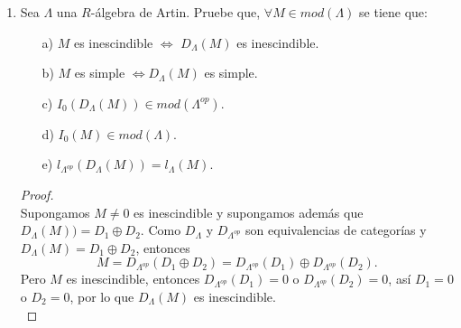 \documentclass{article}
\begin{document}
\begin{enumerate}[label=\textbf{Ej \arabic*.}]
\begin{proof}
			En resumen, todo ideal $I$ de $R$ genera un ideal $Mat_{n \times n}\lrprth{R}$ y viceversa, todo ideal $J$ de $Mat_{n \times n}\lrprth{R}$ induce un ideal de $R$. Por tanto, hay una correspondencia biunívoca
			\begin{align*}
				\lrbrack{Ideales\ de\ R} &\longrightarrow \lrbrack{Ideales\ de\ Mat_{n \times n}\lrprth{R}}\\
				I &\mapsto Mat_{n \times n}\lrprth{I}
			\end{align*}
		
			Finalmente, sea $D$ un anillo con división. Entonces los únicos ideales de $D$ son $0$ y $D$. Por la correspondencia biyectiva entre ideales de $D$ e ideales de $Mat_{n \times n}\lrprth{D}$, se tiene que $Mat_{n \times n}\lrprth{D}$ no tiene ideales propios no triviales.\\
			$\therefore Mat_{n \times n}\lrprth{D}$ es un anillo simple.
		\end{proof}
		
		\item Sea $\Lambda$ una $R$-álgebra de Artin. Pruebe que, $\forall M\in mod(\Lambda)$ se tiene que: 
\begin{itemize}
\item[a)] $M$ es inescindible $\iff$ $D_\Lambda(M)$ es inescindible.
\item[b)] $M$ es simple $\iff D_\Lambda(M)$ es simple.
\item[c)] $I_0(D_\Lambda(M))\in mod(\Lambda^{op})$.
\item[d)] $I_0(M)\in mod(\Lambda)$.
\item[e)] $l_{\Lambda^{op}}(D_\Lambda(M))=l_\Lambda(M).$
\end{itemize}
\begin{proof}
\\
Supongamos $M\neq 0$ es inescindible y supongamos además que\\ $D_\Lambda(M))=D_1\oplus D_2$. Como $D_\Lambda$ y 
$D_{\Lambda^{op}}$ son equivalencias de categorías y $D_\Lambda(M)=D_1\oplus D_2$, entonces 
\[M=D_{\Lambda^{op}}(D_1\oplus D_2)=D_{\Lambda^{op}}(D_1)\oplus D_{\Lambda^{op}}(D_2).\]
Pero $M$ es inescindible, entonces $D_{\Lambda^{op}}(D_1)=0$ o  $D_{\Lambda^{op}}(D_2)=0$, así $D_1=0$ o $D_2=0$, por lo que
$D_\Lambda(M)$ es inescindible.\\


\end{proof}
\end{enumerate}
\end{document}
